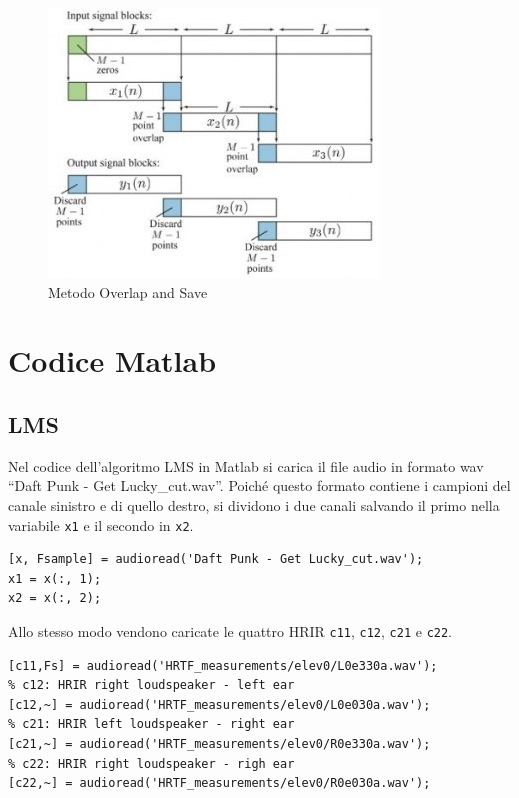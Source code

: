 \documentclass[12pt,a4paper,titlepage]{article}
\begin{document}
\begin{figure}[h]
	\centering	
	\includegraphics[width=.7\textwidth]{Immagini/ols}
	\caption{Metodo Overlap and Save}
	\label{fig:ols}
\end{figure}

\clearpage

\section{Codice Matlab}
\label{sec:codice_matlab}
\subsection{LMS}
\label{subsec:codice_matlab_lms}
Nel codice dell'algoritmo LMS in Matlab si carica il file audio in formato wav ``Daft Punk - Get Lucky\_cut.wav''. Poiché questo formato contiene i campioni del canale sinistro e di quello destro, si dividono i due canali salvando il primo nella variabile \texttt{x1} e il secondo in \texttt{x2}.

\begin{lstlisting}[label=code:caricamento_audio_lms, caption=Caricamento del file audio, captionpos=b]
[x, Fsample] = audioread('Daft Punk - Get Lucky_cut.wav');
x1 = x(:, 1);
x2 = x(:, 2);
\end{lstlisting}

Allo stesso modo vendono caricate le quattro HRIR \texttt{c11}, \texttt{c12}, \texttt{c21} e \texttt{c22}.

\begin{lstlisting}[label=code:caricamento_hrir_lms, caption=Caricamento delle HRIR, captionpos=b]
% c11: HRIR left loudspeaker - left ear
[c11,Fs] = audioread('HRTF_measurements/elev0/L0e330a.wav'); 
% c12: HRIR right loudspeaker - left ear
[c12,~] = audioread('HRTF_measurements/elev0/L0e030a.wav');     
% c21: HRIR left loudspeaker - right ear
[c21,~] = audioread('HRTF_measurements/elev0/R0e330a.wav');    
% c22: HRIR right loudspeaker - righ ear
[c22,~] = audioread('HRTF_measurements/elev0/R0e030a.wav');  
\end{lstlisting}
\end{document}
